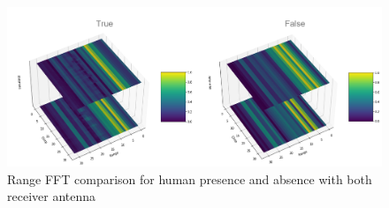 \begin{figure}[ht]
  \begin{center}
    \includegraphics[width=1\textwidth]{Master's thesis/images/4d_fft.PNG} 
    \caption{Range FFT comparison for human presence and absence with both receiver antenna}
    \label{fig:FFT_4d2a}
  \end{center}
\end{figure}   

